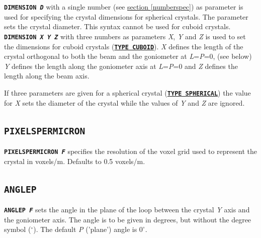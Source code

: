 \documentclass[a4paper]{article}
\newcommand{\Keyword}[1]{\texttt{\textbf{#1}}\xspace}
\newcommand{\SB}{\\[0.2em]}
\begin{document}
\noindent \Keyword{DIMENSION \textit{D}} with a single number (see \hyperref[numberspec]{section \ref*{numberspec}}) as parameter is used for specifying the crystal dimensions for spherical crystals. The parameter sets the crystal diameter. This syntax cannot be used for cuboid crystals.\SB

\noindent \Keyword{DIMENSION \textit{X Y Z}} with three numbers as parameters \textit{X}, \textit{Y} and \textit{Z} is used to set the dimensions for cuboid crystals (\hyperref[crystaltype]{\Keyword{TYPE CUBOID}}).
\textit{X} defines the length of the crystal orthogonal to both the beam and the goniometer at \textit{L}=\textit{P}=0, (see below)
\textit{Y} defines the length along the goniometer axis at \textit{L}=\textit{P}=0 and
\textit{Z} defines the length along the beam axis.

If three parameters are given for a spherical crystal (\hyperref[crystaltype]{\Keyword{TYPE SPHERICAL}}) the value for \textit{X} sets the diameter of the crystal while the values of \textit{Y} and \textit{Z} are ignored.

%
%
%
%
%
%
%


\subsection{\Keyword{PIXELSPERMICRON}}

\noindent \Keyword{PIXELSPERMICRON \textit{F}} 
specifies the resolution of the voxel grid used to represent the crystal in voxels/\hbox{\textmu}m. Defaults to 0.5 voxels/\hbox{\textmu}m.

	
\subsection{\Keyword{ANGLEP}}

\noindent \Keyword{ANGLEP \textit{F}}
sets the angle in the plane of the loop between the crystal \textit{Y} axis and the goniometer axis. The angle is to be given in degrees, but without the degree symbol ($^\circ$). The default \textit{P} ('plane') angle is $0^\circ$.
\end{document}
